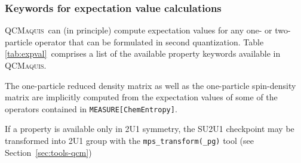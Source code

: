 \documentclass[bibliography=totoc,12pt,a4paper]{scrartcl}
\newcommand{\qcm}{\textsc{QCMaquis}}
\begin{document}
\subsubsection{Keywords for expectation value calculations}
\label{sec:prop-qcm}

\qcm\ can (in principle) compute expectation values for any one- or two-particle operator that can be formulated in
second quantization. Table \ref{tab:expval}\ comprises a list of the available property keywords available in \qcm.

The one-particle reduced density matrix as well as the one-particle spin-density matrix are implicitly computed from the
expectation values of some of the operators contained in \texttt{MEASURE[ChemEntropy]}.

If a property is available only in 2U1 symmetry, the SU2U1 checkpoint may be transformed into 2U1 group with the \texttt{mps\_transform(\_pg)} tool (see Section~\ref{sec:tools-qcm})
\end{document}
